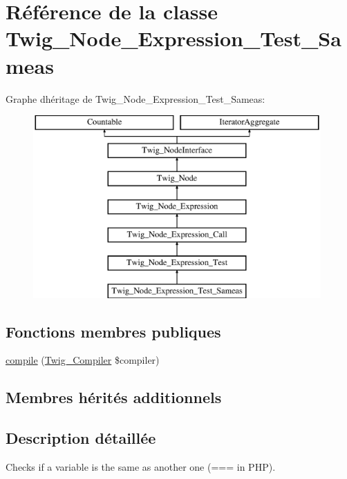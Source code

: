 \hypertarget{class_twig___node___expression___test___sameas}{}\section{Référence de la classe Twig\+\_\+\+Node\+\_\+\+Expression\+\_\+\+Test\+\_\+\+Sameas}
\label{class_twig___node___expression___test___sameas}
Graphe d\textquotesingle{}héritage de Twig\+\_\+\+Node\+\_\+\+Expression\+\_\+\+Test\+\_\+\+Sameas\+:\begin{figure}[H]
\begin{center}
\leavevmode
\includegraphics[height=7.000000cm]{class_twig___node___expression___test___sameas}
\end{center}
\end{figure}
\subsection*{Fonctions membres publiques}
\begin{DoxyCompactItemize}
\item 
\hyperlink{class_twig___node___expression___test___sameas_a4e0faa87c3fae583620b84d3607085da}{compile} (\hyperlink{class_twig___compiler}{Twig\+\_\+\+Compiler} \$compiler)
\end{DoxyCompactItemize}
\subsection*{Membres hérités additionnels}


\subsection{Description détaillée}
Checks if a variable is the same as another one (=== in P\+HP).

